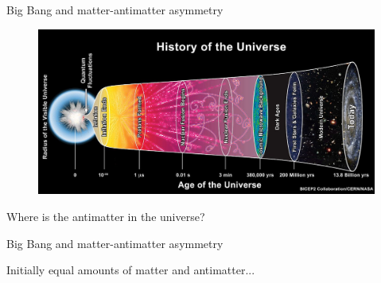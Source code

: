 \documentclass[dvipsnames]{beamer}
\begin{document}
\begin{frame}{Big Bang and matter-antimatter asymmetry}
  \begin{figure}
    \includegraphics[height=5.5cm]{Plots/BigBangHistory.jpg}
  \end{figure}
  \begin{center}
    \Large Where is the antimatter in the universe?\phantom{yq}
  \end{center}
\end{frame}

\begin{frame}{Big Bang and matter-antimatter asymmetry}
  \begin{figure}
  \end{figure}
  \begin{center}
    \Large Initially equal amounts of matter and antimatter...
  \end{center}
\end{frame}
\end{document}
